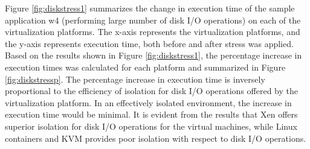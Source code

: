 Figure \ref{fig:diskstress1} summarizes the change in execution time of the sample application w4 (performing large number of disk I/O operations) on each of the virtualization platforms. The x-axis represents the virtualization platforms, and the y-axis represents execution time, both before and after stress was applied. Based on the results shown in Figure \ref{fig:diskstress1}, the percentage increase in execution times was calculated for each platform and summarized in Figure \ref{fig:diskstressp}. The percentage increase in execution time is inversely proportional to the  efficiency of isolation for disk I/O operations offered by the virtualization platform. In an effectively isolated environment, the increase in execution time would be minimal. It is evident from the results that Xen offers superior isolation for disk I/O operations for the virtual machines, while Linux containers and KVM provides poor isolation with respect to disk I/O operations.


%
%
%
%



